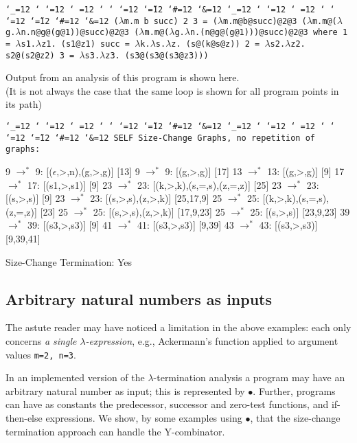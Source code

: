 \documentclass{LMCS}
\makeatletter
\newcommand{\fl}{\noindent}
\newcommand{\bp}{\begin{program}\small}
\newcommand{\ep}{\end{program}}
\newcommand{\programenvironment}{\programmode \def\par{\leavevmode\endgraf}\obeylines\nobreak \programmode}
\newcommand{\programmode}{\tt \catcode`\_=12 \catcode`\?=12 \catcode`\.=12 \catcode`\,=12
	\catcode`\;=12 \catcode`\:=12 \catcode`\@=12 \catcode`\~=12
        \catcode`\#=12 \catcode`\&=12      \obeyspaces\frenchspacing}
\newenvironment{programintext}{\programenvironment}{}
\newenvironment{program}{\setlength{\partopsep}{0mm}\setlength{\topsep}{0mm}
	\begin{trivlist}\item[]
\hspace*{5mm}\begin{minipage}{1.0\textwidth}
\vspace{1mm}
	\begin{programintext}
	}{\end{programintext}
	\vspace{1mm}
	\end{minipage}
	\end{trivlist}
	\noindent}
\theoremstyle{definition}\newtheorem{env}[thm]{Environment}
\makeatother
\begin{document}
\bp
($\lambda$m.m b succ) 2 3  =  ($\lambda$m.m@b@succ)@2@3
($\lambda$m.m@($\lambda$g.$\lambda$n.n@g@(g@1))@succ)@2@3
($\lambda$m.m@($\lambda$g.$\lambda$n.(n@g@(g@1)))@succ)@2@3
{\rm where}
 1   =  $\lambda$s1.$\lambda$z1. (s1@z1)
succ =  $\lambda$k.$\lambda$s.$\lambda$z. (s@(k@s@z))
 2   =  $\lambda$s2.$\lambda$z2. s2@(s2@z2)
 3   =  $\lambda$s3.$\lambda$z3. (s3@(s3@(s3@z3)))

\ep

\fl Output from an analysis of this program is shown here.\\
{\small (It is not always the case that the same loop is shown for all program points in its path)}

\bp
SELF Size-Change Graphs, no repetition of graphs:


9 $\to^* $ 9: [($\epsilon$,>,n),(g,>,g)]           [13]
 9 $\to^*$  9: [(g,>,g)]                   [17]
13 $\to^*$ 13: [(g,>,g)]                   [9]
17 $\to^*$ 17: [(s1,>,s1)]                 [9]
23 $\to^*$ 23: [(k,>,k),(s,=,s),(z,=,z)]   [25]
23 $\to^*$ 23: [(s,>,s)]                   [9]
23 $\to^*$ 23: [(s,>,s),(z,>,k)]           [25,17,9]
25 $\to^*$ 25: [(k,>,k),(s,=,s),(z,=,z)]   [23]
25 $\to^*$ 25: [(s,>,s),(z,>,k)]           [17,9,23]
25 $\to^*$ 25: [(s,>,s)]                   [23,9,23]
39 $\to^*$ 39: [(s3,>,s3)]                 [9]
41 $\to^*$ 41: [(s3,>,s3)]                 [9,39]
43 $\to^*$ 43: [(s3,>,s3)]                 [9,39,41]

Size-Change Termination: Yes

\ep



\subsection{Arbitrary natural numbers as inputs}

The astute reader may have noticed a limitation in the above examples: each only concerns {\em a single $\lambda$-expression}, e.g., Ackermann's function applied to  argument values {\tt m=2, n=3}.

In an implemented version of the $\lambda$-termination analysis
a program may have an arbitrary natural number as input; this is represented by $\bullet$. 
Further, programs can have 
as constants the predecessor, successor and zero-test functions,
and if-then-else expressions. 
We show, by some examples using $\bullet$, that the size-change termination approach
can handle the Y-combinator.
\end{document}
